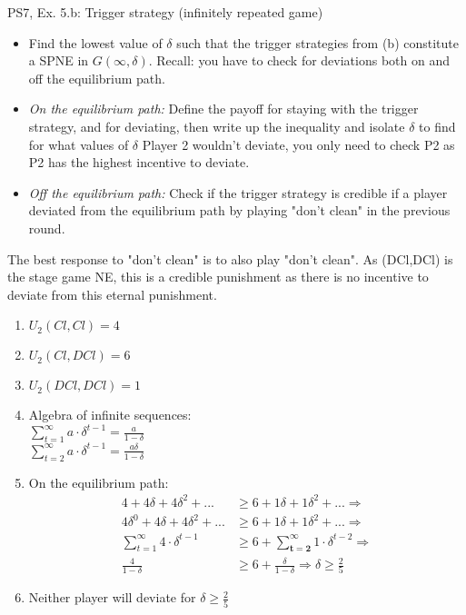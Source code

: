 \begin{frame}{PS7, Ex. 5.b: Trigger strategy (infinitely repeated game)}
    \begin{itemize}
        \item[(b)] Find the lowest value of $\delta$ such that the trigger strategies from (b) constitute a SPNE in $G(\infty,\delta)$. Recall: you have to check for deviations both on and off the equilibrium path.
    \end{itemize}
    \vspace{-8pt}
  \begin{multicols}{2}
    \begin{itemize}
        \item[(Step a)] \textit{On the equilibrium path:} Define the payoff for staying with the trigger strategy, and for deviating, then write up the inequality and isolate $\delta$ to find for what values of $\delta$ Player 2 wouldn't deviate, you only need to check P2 as P2 has the highest incentive to deviate.
        \item[(Step b)] \textit{Off the equilibrium path:} Check if the trigger strategy is credible if a player deviated from the equilibrium path by playing "don't clean" in the previous round.
    \end{itemize}
    The best response to "don't clean" is to also play "don't clean". As (DCl,DCl) is the stage game NE, this is a credible punishment as there is no incentive to deviate from this eternal punishment.
    \vfill\null\columnbreak
    \begin{enumerate}
        \item $U_2(Cl,Cl) = 4$
        \item $U_2(Cl,DCl) = 6$
        \item $U_2(DCl,DCl) = 1$
        \item Algebra of infinite sequences:\\ $\sum_{t=1}^{\infty} a\cdot\delta^{t-1} = \frac{a}{1-\delta}$ \\ $\sum_{t=2}^{\infty} a\cdot\delta^{t-1} = \frac{a\delta}{1-\delta}$
        \item On the equilibrium path:\vspace{-4pt}
        \begin{align*}
            4+4\delta+4\delta^2+...&\geq6+1\delta+1\delta^2+...\Rightarrow\\
            4\delta^0+4\delta+4\delta^2+...&\geq6+1\delta+1\delta^2+...\Rightarrow\\
            \sum_{t=1}^{\infty} 4\cdot\delta^{t-1}&\geq6 + \sum_{\bm{t=2}}^{\infty} 1\cdot\delta^{t-2}\Rightarrow\\
            \frac{4}{1-\delta} &\geq 6 + \frac{\delta}{1-\delta}\Rightarrow
            \delta \geq \frac{2}{5}
        \end{align*}
        \item Neither player will deviate for $\delta \geq \frac{2}{5}$
    \end{enumerate}
    \vfill\null
  \end{multicols}
\end{frame}

